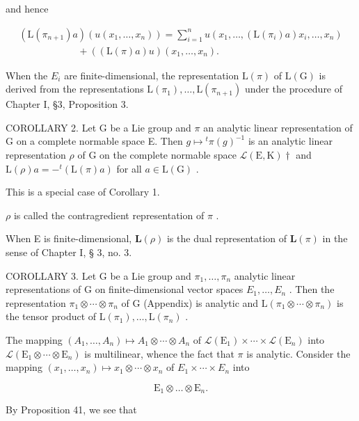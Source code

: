 and hence

\[
\begin{array}{l} (\mathrm{L} (\pi_ {n + 1}) a) (u (x _ {1}, \ldots , x _ {n})) = \sum_ {i = 1} ^ {n} u (x _ {1}, \ldots , (\mathrm{L} (\pi_ {i}) a) x _ {i}, \ldots , x _ {n}) \\ \qquad \qquad \qquad + ((\mathrm{L} (\pi) a) u) (x _ {1}, \ldots , x _ {n}). \end{array}
\]

When the \(E_{i}\) are finite-dimensional, the representation \(\mathrm{L}(\pi)\) of \(\mathrm{L}(\mathrm{G})\) is derived from the representations \(\mathrm{L}(\pi_{1}),\ldots,\mathrm{L}(\pi_{n+1})\) under the procedure of Chapter I, §3, Proposition 3.

COROLLARY 2. Let G be a Lie group and \(\pi\) an analytic linear representation of G on a complete normable space E. Then \(g \mapsto {}^{t}\pi(g)^{-1}\) is an analytic linear representation \(\rho\) of G on the complete normable space \(\mathcal{L}(\mathrm{E}, \mathrm{K})\dagger\) and \(\mathrm{L}(\rho)a = -{}^{t}(\mathrm{L}(\pi)a)\) for all \(a \in \mathrm{L}(\mathrm{G})\) .

This is a special case of Corollary 1.

\(\rho\) is called the contragredient representation of \(\pi\) .

When E is finite-dimensional, \(\mathbf{L}(\rho)\) is the dual representation of \(\mathbf{L}(\pi)\) in the sense of Chapter I, § 3, no. 3.

COROLLARY 3. Let G be a Lie group and \(\pi_1, \ldots, \pi_n\) analytic linear representations of G on finite-dimensional vector spaces \(E_{1},\ldots,E_{n}\) . Then the representation \(\pi_{1}\otimes\cdots\otimes\pi_{n}\) of G (Appendix) is analytic and \(\mathrm{L}(\pi_{1}\otimes\cdots\otimes\pi_{n})\) is the tensor product of \(\mathrm{L}(\pi_{1}),\ldots,\mathrm{L}(\pi_{n})\) .

The mapping \((A_{1},\ldots,A_{n})\mapsto A_{1}\otimes\cdots\otimes A_{n}\) of \(\mathcal{L}(\mathrm{E}_{1})\times\cdots\times\mathcal{L}(\mathrm{E}_{n})\) into \(\mathcal{L}(\mathrm{E}_{1}\otimes\cdots\otimes\mathrm{E}_{n})\) is multilinear, whence the fact that \(\pi\) is analytic. Consider the mapping \((x_{1},\ldots,x_{n})\mapsto x_{1}\otimes\cdots\otimes x_{n}\) of \(E_{1}\times\cdots\times E_{n}\) into

\[
\mathrm{E} _ {1} \otimes \dots \otimes \mathrm{E} _ {n}.
\]

By Proposition 41, we see that

